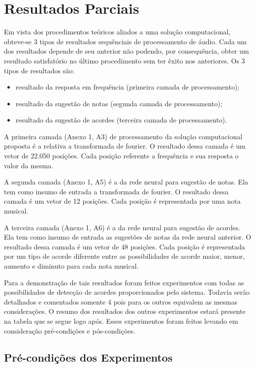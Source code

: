 \chapter{Resultados Parciais}
\label{chap:resultadosparciais}

Em vista dos procedimentos teóricos aliados a uma solução computacional, obteve-se 3 tipos de resultados sequênciais de processamento de áudio.
Cada um dos resultados depende de seu anterior não podendo, por consequência, obter um resultado satisfatório no último procedimento sem ter êxito nos anteriores. Os 3 tipos de resultados são:
\begin{itemize}
    \item resultado da resposta em frequência (primeira camada de processamento);
    \item resultado da sugestão de notas (segunda camada de processamento);
    \item resultado da sugestão de acordes (terceira camada de processamento).
\end{itemize}

A primeira camada (Anexo 1, A3) de processamento da solução computacional proposta é a relativa a transformada de fourier. O resultado dessa camada é um vetor de 22.050 posições. Cada posição referente a frequência e sua resposta o valor da mesma.

A segunda camada (Anexo 1, A5) é a da rede neural para sugestão de notas. Ela tem como insumo de entrada a transformada de fourier. O resultado dessa camada é um vetor de 12 posições. Cada posição é representada por uma nota musical.

A terceira camada (Anexo 1, A6) é a da rede neural para sugestão de acordes. Ela tem como insumo de entrada as sugestões de notas da rede neural anterior. O resultado dessa camada é um vetor de 48 posições. Cada posição é representada por um tipo de acorde diferente entre as possibilidades de acorde maior, menor, aumento e diminuto para cada nota musical.

Para a demonstração de tais resultados foram feitos experimentos com todas as possibilidades de detecção de acordes proporcionados pelo sistema. Todavia serão detalhados e comentados somente 4 pois para os outros equivalem as mesmas considerações. O resumo dos resultados dos outros experimentos estará presente na tabela que se segue logo após. Esses experimentos foram feitos levando em consideração pré-condições e pós-condições.
\newpage

\section{Pré-condições dos Experimentos}
\label{sec:precondicoes}


